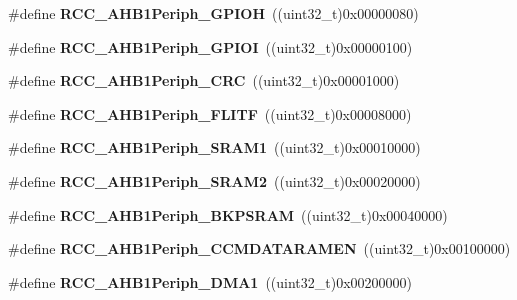 \begin{DoxyCompactItemize}
\#define {\bfseries R\+C\+C\+\_\+\+A\+H\+B1\+Periph\+\_\+\+G\+P\+I\+OH}~((uint32\+\_\+t)0x00000080)
\item 
\mbox{\label{group___r_c_c___a_h_b1___peripherals_ga0c524d44daec48e06fbbb9e2105b3ca4}} 
\#define {\bfseries R\+C\+C\+\_\+\+A\+H\+B1\+Periph\+\_\+\+G\+P\+I\+OI}~((uint32\+\_\+t)0x00000100)
\item 
\mbox{\label{group___r_c_c___a_h_b1___peripherals_ga7314a410cea5a4e45cd6c98f91014379}} 
\#define {\bfseries R\+C\+C\+\_\+\+A\+H\+B1\+Periph\+\_\+\+C\+RC}~((uint32\+\_\+t)0x00001000)
\item 
\mbox{\label{group___r_c_c___a_h_b1___peripherals_gab5efbe63b3089fe814aa078646d76525}} 
\#define {\bfseries R\+C\+C\+\_\+\+A\+H\+B1\+Periph\+\_\+\+F\+L\+I\+TF}~((uint32\+\_\+t)0x00008000)
\item 
\mbox{\label{group___r_c_c___a_h_b1___peripherals_ga34053b56adc7175ac4bcf9b5e02bbc40}} 
\#define {\bfseries R\+C\+C\+\_\+\+A\+H\+B1\+Periph\+\_\+\+S\+R\+A\+M1}~((uint32\+\_\+t)0x00010000)
\item 
\mbox{\label{group___r_c_c___a_h_b1___peripherals_gaa28c3681e26ac56481a715c40c98b5d6}} 
\#define {\bfseries R\+C\+C\+\_\+\+A\+H\+B1\+Periph\+\_\+\+S\+R\+A\+M2}~((uint32\+\_\+t)0x00020000)
\item 
\mbox{\label{group___r_c_c___a_h_b1___peripherals_ga5c43076e3c58665332122f2da55f885f}} 
\#define {\bfseries R\+C\+C\+\_\+\+A\+H\+B1\+Periph\+\_\+\+B\+K\+P\+S\+R\+AM}~((uint32\+\_\+t)0x00040000)
\item 
\mbox{\label{group___r_c_c___a_h_b1___peripherals_ga85a1df0763fa42208189a738b2a4d9c1}} 
\#define {\bfseries R\+C\+C\+\_\+\+A\+H\+B1\+Periph\+\_\+\+C\+C\+M\+D\+A\+T\+A\+R\+A\+M\+EN}~((uint32\+\_\+t)0x00100000)
\item 
\mbox{\label{group___r_c_c___a_h_b1___peripherals_ga2353b6d37cf54175b6a5b71038d7ae1e}} 
\#define {\bfseries R\+C\+C\+\_\+\+A\+H\+B1\+Periph\+\_\+\+D\+M\+A1}~((uint32\+\_\+t)0x00200000)

\end{DoxyCompactItemize}

